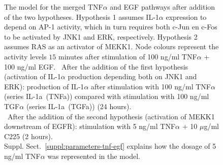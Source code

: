 \begin{figure}[!tpb]
\begin{center}
\end{center}
\caption{\scriptsize
{\bf \protect{}} The model for the merged TNF$\alpha$ and EGF pathways
after addition of the two hypotheses. 
Hypothesis 1 assumes IL-1$\alpha$ expression to depend on AP-1 activity, which in turn requires 
both c-Jun en c-Fos to be activated by JNK1 and ERK, respectively. Hypothesis 2 assumes RAS as an activator 
of MEKK1. Node colours represent the activity levels $15$ minutes
after stimulation of 100 ng/ml TNF$\alpha$ + 100 ng/ml EGF.
{\bf \protect{}}~After the addition of the first hypothesis (activation of IL-1$\alpha$ production depending both
on JNK1 and ERK): production of IL-1$\alpha$ after stimulation with 100 ng/ml TNF$\alpha$ (series {\sf IL-1a~(TNFa)})
compared with stimulation with 100 ng/ml TGF$\alpha$ (series {\sf IL-1a~(TGFa)}) (24 hours).\\
{\bf \protect{}}~After the addition of the second hypothesis (activation of MEKK1 downstream of EGFR):
stimulation with 5 ng/ml TNF$\alpha$ + 10 $\mu$g/ml C225 (2 hours).\\
Suppl. Sect.~\ref{suppl:parameters-tnf-egf} explains how the dosage of 5 ng/ml TNF$\alpha$ was represented in the model.}\label{fig:large-model-graph}
\end{figure}


